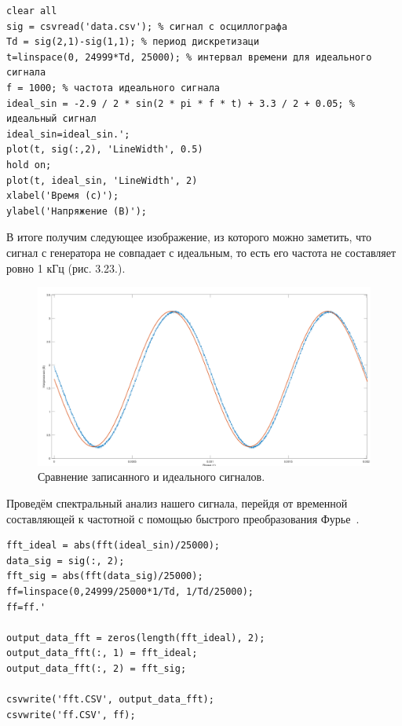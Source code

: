 \begin{code}
\begin{verbatim}
clear all
sig = csvread('data.csv'); % сигнал с осциллографа
Td = sig(2,1)-sig(1,1); % период дискретизаци
t=linspace(0, 24999*Td, 25000); % интервал времени для идеального сигнала
f = 1000; % частота идеального сигнала
ideal_sin = -2.9 / 2 * sin(2 * pi * f * t) + 3.3 / 2 + 0.05; % идеальный сигнал
ideal_sin=ideal_sin.';
plot(t, sig(:,2), 'LineWidth', 0.5)
hold on;
plot(t, ideal_sin, 'LineWidth', 2)
xlabel('Время (с)');
ylabel('Напряжение (В)');
\end{verbatim}
\end{code}

	В итоге получим следующее изображение, из которого можно заметить, что сигнал с генератора не совпадает с идеальным, то есть его частота не составляет ровно 1 кГц (рис. 3.23.).
	
	\begin{figure}[H]
    \centering
    \includegraphics[width=1\textwidth]{../image/ideal.png}
    \caption{Сравнение записанного и идеального сигналов.}
	\end{figure}	
	
	Проведём спектральный анализ нашего сигнала, перейдя от временной составляющей к частотной с помощью быстрого преобразования Фурье~\cite{cos}.

\begin{code}
\begin{verbatim}
fft_ideal = abs(fft(ideal_sin)/25000);
data_sig = sig(:, 2);
fft_sig = abs(fft(data_sig)/25000);
ff=linspace(0,24999/25000*1/Td, 1/Td/25000);
ff=ff.'

output_data_fft = zeros(length(fft_ideal), 2);
output_data_fft(:, 1) = fft_ideal;
output_data_fft(:, 2) = fft_sig;

csvwrite('fft.CSV', output_data_fft);
csvwrite('ff.CSV', ff);
\end{verbatim}
\end{code}
	
